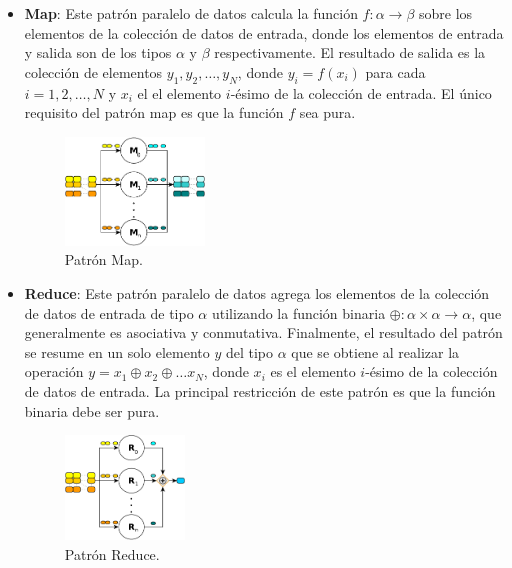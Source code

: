 \begin{itemize}
   \item \textbf{Map}: Este patrón paralelo de datos calcula la función $f: \alpha \rightarrow \beta$ sobre los elementos de la colección de datos de entrada, donde los elementos de entrada y salida son de los tipos $\alpha$ y $\beta$ respectivamente. El resultado de salida es la colección de elementos $y_{1}, y_{2}, \ldots, y_{N}$, donde $y_{i} = f(x_{i})$ para cada $i = 1, 2, \ldots, N$ y $x_{i}$ el el elemento $i$-ésimo de la colección de entrada. El único requisito del patrón map es que la función $f$ sea pura. 
   
   \vspace{0.35cm}
   \begin{figure}[htb]
    \centering
    \includegraphics[width=0.35\textwidth]{figures/map.pdf}
    \caption{Patrón Map.}
    \label{fig:chap3:map}
    \end{figure}
    \vspace{0.35cm}
    
    \item \textbf{Reduce}: Este patrón paralelo de datos agrega los elementos de la colección de datos de entrada de tipo $\alpha$ utilizando la función binaria $\oplus: \alpha \times \alpha \to \alpha $, que generalmente es asociativa y conmutativa. Finalmente, el resultado del patrón se resume en un solo elemento $y$ del tipo $\alpha$ que se obtiene al realizar la operación $y = x_{1} \oplus x_{2} \oplus \ldots x_{N}$, donde $x_{i}$ es el elemento $i$-ésimo de la colección de datos de entrada. La principal restricción de este patrón es que la función binaria debe ser pura.
    
    \vspace{0.35cm}
    \begin{figure}[htb]
    \centering
    \includegraphics[width=0.3\textwidth]{figures/reduce.pdf}
    \caption{Patrón Reduce.}
    \label{fig:chap3:reduce}
    \end{figure}
    \vspace{0.35cm}


\end{itemize}
